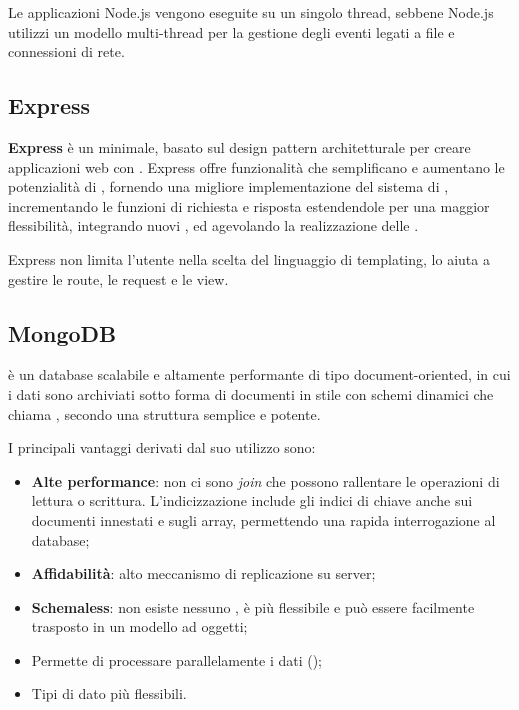 Le applicazioni Node.js vengono eseguite su un singolo thread, sebbene Node.js utilizzi un modello multi-thread per la gestione degli eventi legati a file e connessioni di rete.


\subsection{Express}
\textbf{Express} è un  minimale, basato sul design pattern architetturale  per creare applicazioni web con . 
Express offre funzionalità che semplificano e aumentano le potenzialità di , fornendo una migliore implementazione del sistema di , incrementando le funzioni di richiesta e risposta estendendole per una maggior flessibilità, integrando nuovi , ed agevolando la realizzazione delle .

Express non limita l'utente nella scelta del linguaggio di templating, lo aiuta a gestire le route, le request e le view.


\subsection{MongoDB}
 è un database   scalabile e altamente performante di tipo document-oriented, in cui i dati sono archiviati sotto forma di documenti in stile  con schemi dinamici che  chiama , secondo una struttura semplice e potente.

I principali vantaggi derivati dal suo utilizzo sono:
\begin{itemize}
	\item \textbf{Alte performance}: non ci sono \emph{join} che possono rallentare le operazioni di lettura o scrittura. L'indicizzazione include gli indici di chiave anche sui documenti innestati e sugli array, permettendo una rapida interrogazione al database;
	\item \textbf{Affidabilità}: alto meccanismo di replicazione su server;
	\item \textbf{Schemaless}: non esiste nessuno , è più flessibile e può essere facilmente trasposto in un modello ad oggetti;
	\item Permette di processare parallelamente i dati ();
	\item Tipi di dato più flessibili.
\end{itemize}

